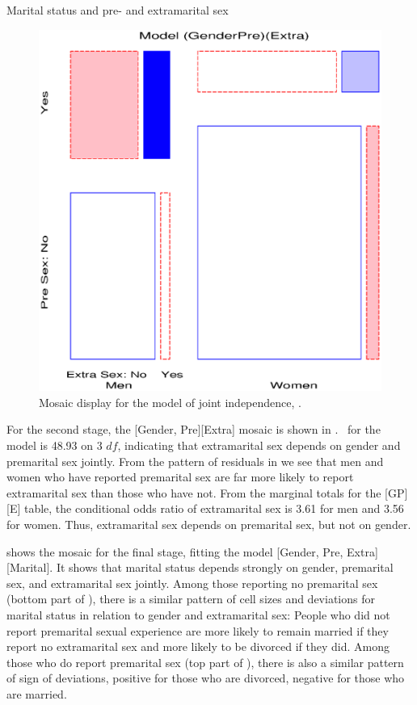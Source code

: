 \begin{Example}[marital1]{Marital status and pre- and extramarital sex}
\begin{figure}[htb]
\begin{minipage}[b]{.49\linewidth}
  \includegraphics[width=1\linewidth]{ch4/fig/mosaic52}
  \caption[Mosaic display for the model of
joint independence]{Mosaic display for the model of
joint independence, .}\label{fig:mosaic52}
 \end{minipage}
\end{figure}

For the second stage, the [Gender, Pre][Extra] mosaic is shown in 
.  \GSQ\ for the model 
is 48.93 on 3 \(df\), indicating that extramarital sex
depends on
gender and premarital sex jointly.  From the pattern
of residuals in  we see that men and
women who have reported premarital sex are far more likely to report
extramarital sex than those who have not.  From the marginal totals
for the [GP] [E] table, the conditional odds ratio of extramarital
sex is 3.61 for men and 3.56 for women.  Thus, extramarital sex
depends on premarital sex, but not on gender.


 shows the mosaic for the final stage, fitting
the model [Gender, Pre, Extra] [Marital].
It shows that
marital status depends
strongly on gender, premarital sex, and extramarital sex jointly.
Among those reporting no
premarital sex (bottom part of ), there
is a similar pattern of cell sizes and deviations for marital status
in relation to gender and extramarital sex:  People who did
not report premarital sexual experience are more likely to
remain married if they report no extramarital sex and more likely
to be divorced if they did.  Among those who do report premarital
sex (top part of ), there is also a similar
pattern of sign of deviations, positive for those who are divorced,
negative for those who are married.


\end{Example}
